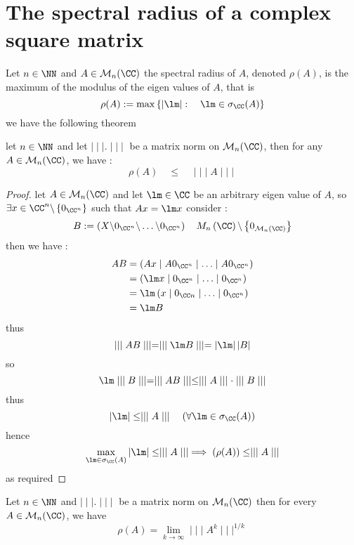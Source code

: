 \section{The spectral radius of a complex square matrix}
\begin{definition}[]
Let $n \in \NN$ and $A \in \mathcal{M} _{n}(\CC ) $ the spectral radius of $A$, denoted
$\rho (A) $, is the maximum of the modulus of the eigen values of $A$, that is 
\[
\rho (A) :=
\max \left\{ 
	\left|  \lm \right| : \quad 
	\lm \in  \sigma _{\CC }   (A) 
\right\}
\]
we have the following theorem 
\end{definition}
\begin{theorem}[]
let $n \in \NN$ and let $\mid \mid \mid  . \mid \mid \mid $ be a matrix norm on
$\mathcal{M} _{n}(\CC ) $, then for any $A \in \mathcal{M} _{n}(\CC ) $, we have : 
\[
	\rho \left( A \right) \quad  \leq  \quad 
	\mid \mid \mid  A \mid \mid \mid 
\]
\end{theorem}
\begin{proof}
let $A \in \mathcal{M} _{n}(\CC ) $ and let $\lm \in \CC $  be an arbitrary eigen value 
of $A$, so $\exists  x \in \CC ^{n} \backslash  \left\{ 0_{\CC ^n } \right\}$ such that 
$Ax = \lm x$ consider : 
\[
B := \left( X \backslash 0_{\CC ^{n}} \backslash \hdots \backslash 0_{\CC ^n } \right) 
\quad M_{n} \left( \CC  \right) \backslash 
\left\{ 0_{\mathcal{M} _{n}(\CC ) } \right\}
\]
then we have : 
\begin{align*}
	AB &= \left( Ax \mid  A 0_{\CC ^n } \mid  \hdots \mid  A 0_{\CC ^n } \right) \\
          &= 
	  \left( \lm x \mid  0_{\CC ^n } \mid  \hdots \mid  0_{\CC ^n } \right) \\
	  &= 
	  \lm \left( x \mid  0_{\CC n} \mid  \hdots \mid  0_{\CC^n } \right)
	  \\
	  &= \lm B 
\end{align*}
thus 
\[
\mid \mid \mid  AB \mid \mid \mid  = \mid \mid \mid  \lm B \mid \mid \mid  =
\left| \lm \right| \left| B \right|
\]
so 
\[
\lm \mid \mid \mid  B \mid \mid \mid  = 
\mid \mid \mid  A B  \mid \mid \mid  \leq 
\mid \mid \mid  A \mid \mid \mid  \cdot  
\mid \mid \mid  B \mid \mid \mid 
\]
thus 
\[
\left| \lm \right| \leq \mid \mid \mid  A \mid \mid \mid  
\quad \left( \forall  \lm \in  \sigma _{\CC }(A)    \right)
\]
hence
\[
\max _{\lm \in \sigma _{\CC } \left( A \right)  } \left| \lm \right| \leq 
\mid \mid \mid  A \mid \mid \mid    \implies 
\left( \rho (A)  \right) \leq 
\mid \mid \mid  A \mid \mid \mid  
\]
as required 
\end{proof}
\begin{theorem}
	Let $n \in \NN$  and $\mid \mid \mid  . \mid \mid \mid $  
	be a matrix norm on $\mathcal{M} _{n}(\CC ) $  then for every
	$A \in \mathcal{M} _{n}(\CC ) $, we have
	\[
	\rho(A)  = 
	\lim_{k \to \infty } 
	\mid \mid \mid  A^{k} \mid \mid \mid ^{1/k}
	\]
\end{theorem}
